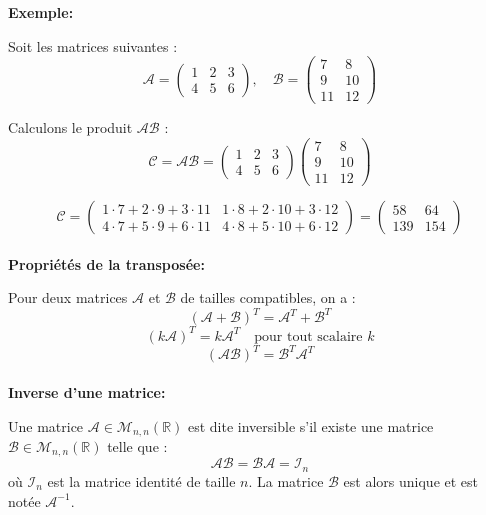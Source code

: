 \textbf{Exemple:}

Soit les matrices suivantes :
\[
\mathcal{A} = \begin{pmatrix}
1 & 2 & 3 \\
4 & 5 & 6
\end{pmatrix}, \quad
\mathcal{B} = \begin{pmatrix}
7 & 8 \\
9 & 10 \\
11 & 12
\end{pmatrix}
\]

Calculons le produit $\mathcal{A} \mathcal{B}$ :
\[
\mathcal{C} = \mathcal{A} \mathcal{B} = \begin{pmatrix}
1 & 2 & 3 \\
4 & 5 & 6
\end{pmatrix}
\begin{pmatrix}
7 & 8 \\
9 & 10 \\
11 & 12
\end{pmatrix}
\]

\[
\mathcal{C} = \begin{pmatrix}
1 \cdot 7 + 2 \cdot 9 + 3 \cdot 11 & 1 \cdot 8 + 2 \cdot 10 + 3 \cdot 12 \\
4 \cdot 7 + 5 \cdot 9 + 6 \cdot 11 & 4 \cdot 8 + 5 \cdot 10 + 6 \cdot 12
\end{pmatrix}
= \begin{pmatrix}
58 & 64 \\
139 & 154
\end{pmatrix}
\] \\

\textbf{Propriétés de la transposée:}

Pour deux matrices $\mathcal{A}$ et $\mathcal{B}$ de tailles compatibles, on a :
\[
(\mathcal{A} + \mathcal{B})^T = \mathcal{A}^T + \mathcal{B}^T
\]
\[
(k\mathcal{A})^T = k\mathcal{A}^T \quad \text{pour tout scalaire } k
\]
\[
(\mathcal{A} \mathcal{B})^T = \mathcal{B}^T \mathcal{A}^T
\] \\

\textbf{Inverse d'une matrice:}

Une matrice $\mathcal{A} \in \mathcal{M}_{n,n}(\mathbb{R})$ est dite inversible s'il existe une matrice $\mathcal{B} \in \mathcal{M}_{n,n}(\mathbb{R})$ telle que :
\[
\mathcal{A} \mathcal{B} = \mathcal{B} \mathcal{A} = \mathcal{I}_n
\]
où $\mathcal{I}_n$ est la matrice identité de taille $n$. La matrice $\mathcal{B}$ est alors unique et est notée $\mathcal{A}^{-1}$. \\

